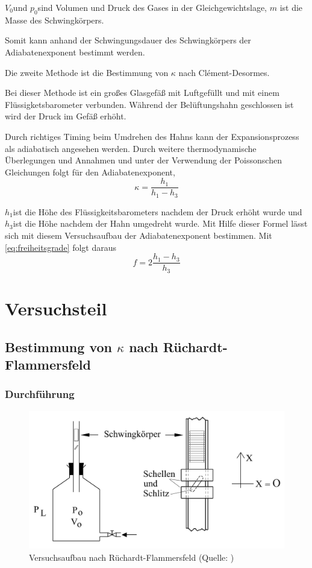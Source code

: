 $V_{0}$und $p_{0}$sind Volumen und Druck des Gases in der Gleichgewichtslage,
$m$ ist die Masse des Schwingkörpers.

Somit kann anhand der Schwingungsdauer des Schwingkörpers der Adiabatenexponent
bestimmt werden.

Die zweite Methode ist die Bestimmung von $\kappa$ nach Clément-Desormes.

Bei dieser Methode ist ein großes Glasgefäß mit Luftgefüllt und mit
einem Flüssigketsbarometer verbunden. Während der Belüftungshahn geschlossen
ist wird der Druck im Gefäß erhöht.

Durch richtiges Timing beim Umdrehen des Hahns kann der Expansionsprozess
als adiabatisch angesehen werden. Durch weitere thermodynamische Überlegungen
und Annahmen und unter der Verwendung der Poissonschen Gleichungen
folgt für den Adiabatenexponent,
\begin{equation}
\kappa=\frac{h_{1}}{h_{1}-h_{3}}\label{eq:adiabatenexponent2}
\end{equation}


$h_{1}$ist die Höhe des Flüssigkeitsbarometers nachdem der Druck
erhöht wurde und $h_{3}$ist die Höhe nachdem der Hahn umgedreht wurde.
Mit Hilfe dieser Formel lässt sich mit diesem Versuchsaufbau der Adiabatenexponent
bestimmen. Mit \eqref{eq:freiheitsgrade} folgt daraus
\begin{equation}
f = 2\frac{h_1 - h_3}{h_3}
\end{equation}
\newpage

\section{Versuchsteil}

\subsection{Bestimmung von $ \kappa $ nach Rüchardt-Flammersfeld}
\subsubsection{Durchführung}
\begin{figure}[H]
\centering
\includegraphics[width=0.7\linewidth]{./bilder/versuch1}
\caption{Versuchsaufbau nach Rüchardt-Flammersfeld (Quelle: \cite{anleitung2015})}
\label{fig:aufbau1}
\end{figure}

